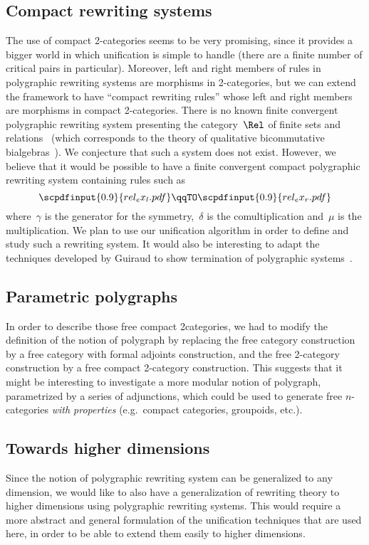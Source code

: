 \documentclass{LMCS}
\newcommand{\strid}[1]{\scpdfinput{0.9}{#1.pdf}}
\begin{document}
\subsection{Compact rewriting systems}
The use of compact 2-categories seems to be very promising, since it provides a
bigger world in which unification is simple to handle (there are a finite number
of critical pairs in particular). Moreover, left and right members of rules in
polygraphic rewriting systems are morphisms in 2-categories, but we can extend
the framework to have ``compact rewriting rules'' whose left and right members
are morphisms in compact 2-categories. There is no known finite convergent
polygraphic rewriting system presenting the category~$\Rel$ of finite sets and
relations~\cite{lafont:boolean-circuits} (which corresponds to the theory of
qualitative bicommutative bialgebras~\cite{mimram:first-order-causality}). We
conjecture that such a system does not exist. However, we believe that it would
be possible to have a finite convergent compact polygraphic rewriting system
containing rules such as
\[
\strid{rel_ex_l}
\qqTO
\strid{rel_ex_r}
\]
where~$\gamma$ is the generator for the symmetry,~$\delta$ is the
comultiplication and~$\mu$ is the multiplication. We plan to use our unification
algorithm in order to define and study such a rewriting system. It would also be
interesting to adapt the techniques developed by Guiraud to show termination of
polygraphic systems~\cite{guiraud:termination-3-rewr}.

\subsection{Parametric polygraphs}
In order to describe those free compact 2\nbd categories, we had to modify the
definition of the notion of polygraph by replacing the free category
construction by a free category with formal adjoints construction, and the free
2-category construction by a free compact 2-category construction. This suggests
that it might be interesting to investigate a more modular notion of polygraph,
parametrized by a series of adjunctions, which could be used to generate free
$n$-categories \emph{with properties} (e.g.~compact categories, groupoids,
etc.).

\subsection{Towards higher dimensions}
Since the notion of polygraphic rewriting system can be generalized to any
dimension, we would like to also have a generalization of rewriting theory to
higher dimensions using polygraphic rewriting systems. This would require a more
abstract and general formulation of the unification techniques that are used
here, in order to be able to extend them easily to higher dimensions.
\end{document}
